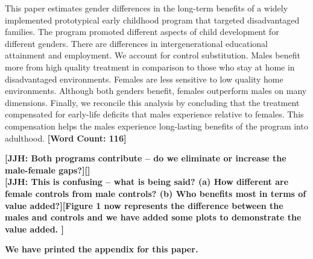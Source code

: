 \noindent This paper estimates gender differences in the long-term benefits of a widely implemented prototypical early childhood program that targeted disadvantaged families. The program promoted different aspects of child development for different genders. There are differences in intergenerational educational attainment and employment. We account for control substitution. Males benefit more from high quality treatment in comparison to those who stay at home in disadvantaged environments. Females are less sensitive to low quality home environments. Although both genders benefit, females outperform males on many dimensions. Finally, we reconcile this analysis by concluding that the treatment compensated for early-life deficits that males experience relative to females. This compensation helps the males experience long-lasting benefits of the program into adulthood. \textbf{[Word Count: 116]} 

\textbf{[JJH: Both programs contribute -- do we eliminate or increase the male-female gaps?][]} \\
\textbf{[JJH: This is confusing -- what is being said? (a) How different are female controls from male controls? (b) Who benefits most in terms of value added?][Figure 1 now represents the difference between the males and controls and we have added some plots to demonstrate the value added. ]} 

\textbf{We have printed the appendix for this paper.}